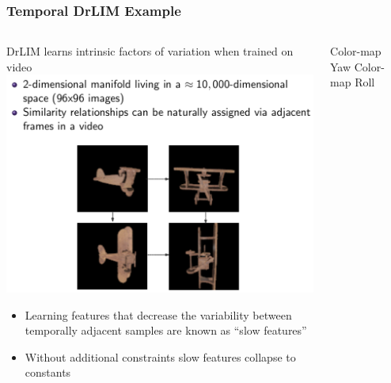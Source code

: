 \documentclass{beamer}
\begin{document}
\begin{frame}
\begin{columns}[T]
\begin{column}{.4\textwidth}
\end{column}
\end{columns}
\end{frame}

\begin{frame} 
\frametitle{Temporal DrLIM Example}
\begin{columns}[T] %
\begin{column}{.5\textwidth}
DrLIM learns intrinsic factors of variation when trained on video \\ \vspace{0.25cm} 
\includegraphics[scale=0.20]{./Figures/drlim_data.png} 
\begin{itemize} \tiny \item{Learning features that decrease the variability between temporally adjacent samples are known as ``slow features''} 
\tiny \item{Without additional constraints slow features collapse to constants}
\end{itemize} 
\end{column} 
\begin{column}{.5\textwidth}
\hspace{0.25cm} \tiny{Color-map Yaw} \hspace{0.8cm} \tiny{Color-map Roll} \\

\end{column}
\end{columns}
\end{frame}
\end{document}
